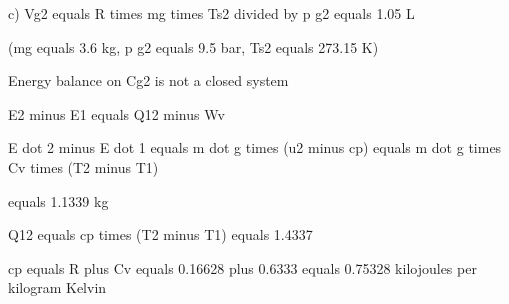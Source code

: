 c) Vg2 equals R times mg times Ts2 divided by p g2 equals 1.05 L

(mg equals 3.6 kg, p g2 equals 9.5 bar, Ts2 equals 273.15 K)

Energy balance on Cg2 is not a closed system

E2 minus E1 equals Q12 minus Wv

E dot 2 minus E dot 1 equals m dot g times (u2 minus cp) equals m dot g times Cv times (T2 minus T1)

equals 1.1339 kg

Q12 equals cp times (T2 minus T1) equals 1.4337

cp equals R plus Cv equals 0.16628 plus 0.6333 equals 0.75328 kilojoules per kilogram Kelvin